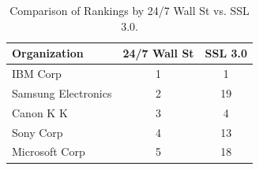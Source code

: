 \begin{table}[t]
\centering
\begin{tabular}{|l|c|c|}
\hline
\textbf{Organization}        & \multicolumn{1}{l|}{\textbf{24/7 Wall St}} & \multicolumn{1}{l|}{\textbf{SSL 3.0}} \\ \hline
IBM Corp                     & 1                                          & 1                                         \\ \hline
Samsung Electronics          & 2                                          & 19                                        \\ \hline
Canon K K                    & 3                                          & 4                                         \\ \hline
Sony Corp                    & 4                                          & 13                                        \\ \hline
Microsoft Corp               & 5                                          & 18                                        \\ \hline
\end{tabular}
\caption{Comparison of Rankings by 24/7 Wall St vs. SSL 3.0.}
\label{tab:validation}
\end{table}

